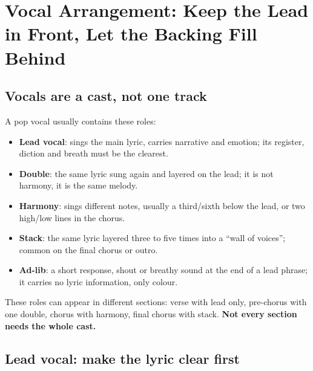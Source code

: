 \chapter{Vocal Arrangement: Keep the Lead in Front, Let the Backing Fill Behind}
\label{ch:vocals}


\section{Vocals are a cast, not one track}
\label{sec:vocal-roles}

A pop vocal usually contains these roles:

\begin{itemize}
\item \textbf{Lead vocal}: sings the main lyric, carries narrative and emotion; its register, diction and breath must be the clearest.
\item \textbf{Double}: the same lyric sung again and layered on the lead; it is not harmony, it is the same melody.
\item \textbf{Harmony}: sings different notes, usually a third/sixth below the lead, or two high/low lines in the chorus.
\item \textbf{Stack}: the same lyric layered three to five times into a ``wall of voices''; common on the final chorus or outro.
\item \textbf{Ad-lib}: a short response, shout or breathy sound at the end of a lead phrase; it carries no lyric information, only colour.
\end{itemize}

These roles can appear in different sections: verse with lead only, pre-chorus with one double, chorus with harmony, final chorus with stack. \textbf{Not every section needs the whole cast.}

\section{Lead vocal: make the lyric clear first}
\label{sec:lead-vocal}

